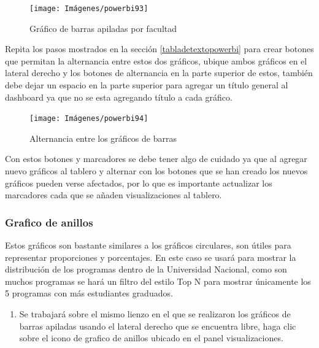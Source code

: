 \documentclass[
]{book}
\providecommand{\tightlist}{%
  \setlength{\itemsep}{0pt}\setlength{\parskip}{0pt}}
\begin{document}
\begin{figure}

{\centering \texttt{[image: Imágenes/powerbi93]} 

}

\caption{Gráfico de barras apiladas por facultad}\label{fig:barrasapiladasfacultad-fig}
\end{figure}

Repita los pasos mostrados en la sección \ref{tabladetextopowerbi} para crear botones que permitan la alternancia entre estos dos gráficos, ubique ambos gráficos en el lateral derecho y los botones de alternancia en la parte superior de estos, también debe dejar un espacio en la parte superior para agregar un título general al dashboard ya que no se esta agregando título a cada gráfico.

\begin{figure}

{\centering \texttt{[image: Imágenes/powerbi94]} 

}

\caption{Alternancia entre los gráficos de barras}\label{fig:alternanciaentrebarrasapiladas-fig}
\end{figure}

Con estos botones y marcadores se debe tener algo de cuidado ya que al agregar nuevo gráficos al tablero y alternar con los botones que se han creado los nuevos gráficos pueden verse afectados, por lo que es importante actualizar los marcadores cada que se añaden visualizaciones al tablero.

\hypertarget{gruxe1ficoanillos}{%
\subsubsection{Grafico de anillos}\label{gruxe1ficoanillos}}

Estos gráficos son bastante similares a los gráficos circulares, son útiles para representar proporciones y porcentajes. En este caso se usará para mostrar la distribución de los programas dentro de la Universidad Nacional, como son muchos programas se hará un filtro del estilo Top N para mostrar únicamente los 5 programas con más estudiantes graduados.

\begin{enumerate}
\def\labelenumi{\arabic{enumi}.}
\tightlist
\item
  Se trabajará sobre el mismo lienzo en el que se realizaron los gráficos de barras apiladas usando el lateral derecho que se encuentra libre, haga clic sobre el icono de grafico de anillos ubicado en el panel visualizaciones.
\end{enumerate}
\end{document}
